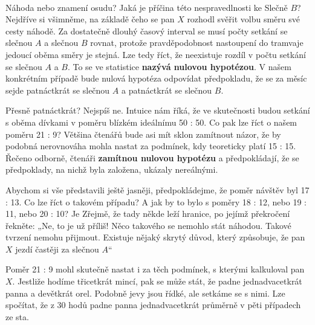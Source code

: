 \begin{mdframed}[style=mdexam]
\begin{example}
    {\centering
    \captionsetup{type=figure}
      {}                                                    \\
      {}
    \par}

    Náhoda nebo znamení osudu? Jaká je příčina této nespravedlnosti ke Slečně \(B\)? Nejdříve si
    všimněme, na základě čeho se pan \(X\) rozhodl svěřit volbu směru své cesty náhodě. Za
    dostatečně dlouhý časový interval se musí počty setkání se slečnou \(A\) a slečnou \(B\) rovnat,
    protože pravděpodobnost nastoupení do tramvaje jedoucí oběma směry je stejná. Lze tedy říct, že
    neexistuje rozdíl v počtu setkání se slečnou \(A\) a \(B\). To se ve statistice \textbf{nazývá
    nulovou hypotézou}. V našem konkrétním případě bude nulová hypotéza odpovídat předpokladu, že se
    za měsíc sejde patnáctkrát se slečnou \(A\) a patnáctkrát se slečnou \(B\).

    Přesně patnáctkrát? Nejspíš ne. Intuice nám říká, že ve skutečnosti budou setkání s oběma
    dívkami v poměru blízkém ideálnímu 50 : 50. Co pak lze říct o našem poměru 21 : 9? Většina
    čtenářů bude asi mít sklon zamítnout názor, že by podobná nerovnováha mohla nastat za podmínek,
    kdy teoreticky platí 15 : 15. Řečeno odborně, čtenáři \textbf{zamítnou nulovou hypotézu} a
    předpokládají, že se předpoklady, na nichž byla založena, ukázaly nereálnými. 

    Abychom si vše představili ještě jasněji, předpokládejme, že poměr návštěv byl 17 : 13. Co lze
    říct o takovém případu? A jak by to bylo s poměry 18 : 12, nebo 19 : 11, nebo 20 : 10? Je
    Zřejmě, že tady někde leží hranice, po jejímž překročení řekněte: „Ne, to je už příliš! Něco
    takového se nemohlo stát náhodou. Takové tvrzení nemohu přijmout. Existuje nějaký skrytý důvod,
    který způsobuje, že pan \(X\) jezdí častěji za slečnou \(A\)“

    Poměr 21 : 9 mohl skutečně nastat i za těch podmínek, s kterými kalkuloval pan \(X\). Jestliže
    hodíme třicetkrát mincí, pak se může stát, že padne jednadvacetkrát panna a devětkrát orel.
    Podobně jevy jsou řídké, ale setkáme se s nimi. Lze spočítat, že z 30 hodů padne panna
    jednadvacetkrát průměrně v pěti případech ze sta. 


\end{example}
\end{mdframed}

